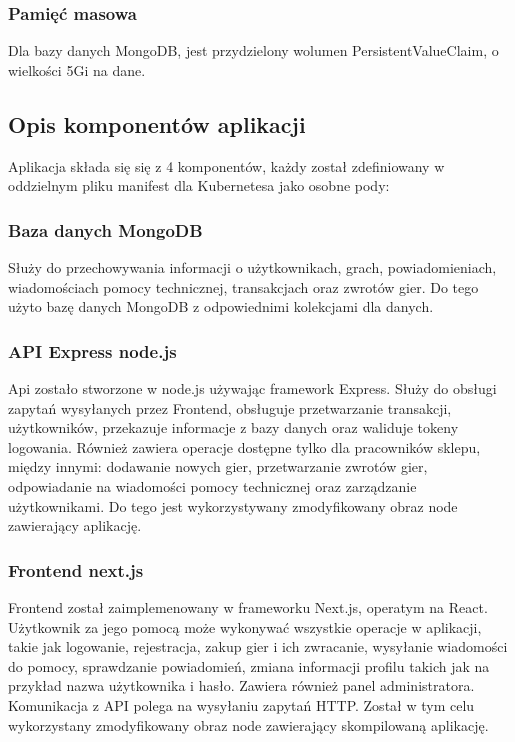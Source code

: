 \documentclass[12pt,a4paper]{article}
\begin{document}
\subsubsection{Pamięć masowa}
Dla bazy danych MongoDB, jest przydzielony wolumen PersistentValueClaim, o wielkości 5Gi na dane.


\subsection{Opis komponentów aplikacji}
\label{sec:FunctionalConditions}
Aplikacja składa się się z 4 komponentów, każdy został zdefiniowany w oddzielnym pliku manifest dla Kubernetesa jako osobne pody:

\subsubsection{Baza danych MongoDB}
Służy do przechowywania informacji o użytkownikach, grach, powiadomieniach, wiadomościach pomocy technicznej, transakcjach oraz zwrotów gier. Do tego użyto bazę danych MongoDB z odpowiednimi kolekcjami dla danych.

\subsubsection{API Express node.js}
Api zostało stworzone w node.js używając framework Express. Służy do obsługi zapytań wysyłanych przez Frontend, obsługuje przetwarzanie transakcji, użytkowników, przekazuje informacje z bazy danych oraz waliduje tokeny logowania. Również zawiera operacje dostępne tylko dla pracowników sklepu, między innymi: dodawanie nowych gier, przetwarzanie zwrotów gier, odpowiadanie na wiadomości pomocy technicznej oraz zarządzanie użytkownikami. Do tego jest wykorzystywany zmodyfikowany obraz node zawierający aplikację. 

\subsubsection{Frontend next.js}
Frontend został zaimplemenowany w frameworku Next.js, operatym na React. Użytkownik za jego pomocą może wykonywać wszystkie operacje w aplikacji, takie jak logowanie, rejestracja, zakup gier i ich zwracanie, wysyłanie wiadomości do pomocy, sprawdzanie powiadomień, zmiana informacji profilu takich jak na przykład nazwa użytkownika i hasło. Zawiera również panel administratora. Komunikacja z API polega na wysyłaniu zapytań HTTP. Został w tym celu wykorzystany zmodyfikowany obraz node zawierający skompilowaną aplikację.
\end{document}
